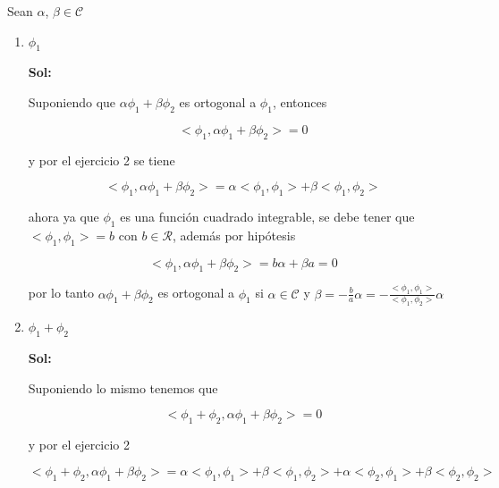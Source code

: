 \documentclass[12pt,a4paper]{article}
\begin{document}
\begin{enumerate}
    
    Sean $\alpha$, $\beta \in \mathcal{C}$
    \begin{enumerate}
    
        \item $\phi_1$
        
        \textbf{Sol:}
        
        Suponiendo que $\alpha \phi_1 + \beta \phi_2 $ es ortogonal a $\phi_1$, entonces
        
        \begin{equation*}
            <\phi_1,\alpha \phi_1 + \beta \phi_2> = 0
        \end{equation*}
        
        y por el ejercicio 2 se tiene
        
        \begin{equation*}
            <\phi_1,\alpha \phi_1 + \beta \phi_2> = \alpha<\phi_1,\phi_1> + \beta <\phi_1 , \phi_2>
        \end{equation*}
        
        ahora ya que $\phi_1$ es una función cuadrado integrable, se debe tener que $<\phi_1,\phi_1> = b$ con $b \in \mathcal{R}$, además por hipótesis
        
        \begin{equation*}
            <\phi_1,\alpha \phi_1 + \beta \phi_2> = b \alpha  + \beta a =0 
        \end{equation*}
        
        por lo tanto $\alpha \phi_1 + \beta \phi_2$ es ortogonal a $\phi_1$ si  
        $\alpha \in \mathcal{C}$ y $\beta = -\frac{b}{a} \alpha = - \frac{<\phi_1,\phi_1>}{<\phi_1,\phi_2>} \alpha$
        
        \item $\phi_1 + \phi_2$
        
        \textbf{Sol:}
        
        Suponiendo lo mismo tenemos que
        
        \begin{equation*}
            <\phi_1 + \phi_2 , \alpha \phi_1 + \beta \phi_2> = 0
        \end{equation*}
        
        y por el ejercicio 2
        
        \begin{equation*}
            <\phi_1 + \phi_2 , \alpha \phi_1 + \beta \phi_2> = \alpha <\phi_1 , \phi_1> + \beta <\phi_1 , \phi_2> + \alpha <\phi_2 , \phi_1> + \beta <\phi_2 , \phi_2>
        \end{equation*}
        

\end{enumerate}
\end{enumerate}
\end{document}
